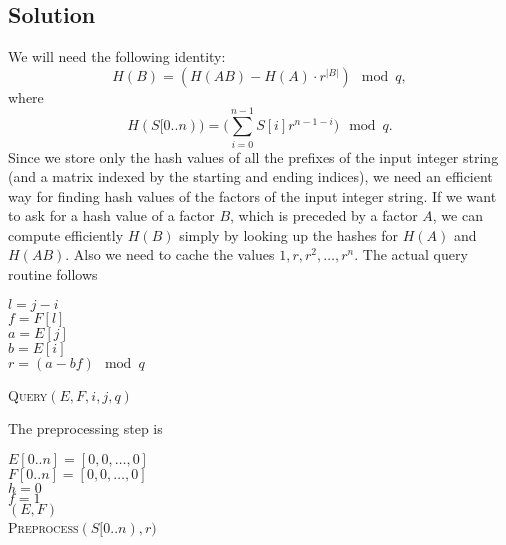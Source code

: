 \documentclass[10pt]{article}
\begin{document}
\subsection*{Solution}
We will need the following identity:
\[
H(B) = (H(AB) - H(A) \cdot r^{|B|}) \mod q,
\]
where
\[
H(S[0..n)) = \Bigg( \sum_{i = 0}^{n - 1} S[i] r^{n - 1 - i} \Bigg) \mod q.
\]
Since we store only the hash values of all the prefixes of the input integer string (and a matrix indexed by the starting and ending indices), we need an efficient way for finding hash values of the factors of the input integer string. If we want to ask for a hash value of a factor $B$, which is preceded by a factor $A$, we can compute efficiently $H(B)$ simply by looking up the hashes for $H(A)$ and $H(AB)$. Also we need to cache the values $1, r, r^2, \dots, r^n$.
The actual query routine follows
\begin{algorithm}
$l = j - i$ \\
$f = F[l]$ \\
$a = E[j]$ \\
$b = E[i]$ \\
$r = (a - bf) \mod q $ \\
\caption{\textsc{Query}$(E, F, i, j, q)$}
\end{algorithm}
The preprocessing step is
\begin{algorithm}
$E[0..n] = [0, 0, \dots, 0]$ \\
$F[0..n] = [0, 0, \dots, 0]$ \\
$h = 0$ \\
$f = 1$ \\
\KwRet $(E, F)$ \\
\caption{\textsc{Preprocess}$(S[0..n), r)$}
\end{algorithm}
\end{document}
